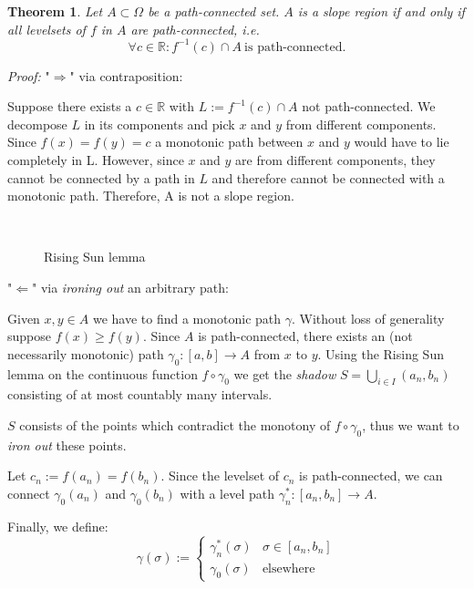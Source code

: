 \documentclass[11pt,twoside,twocolumn,a4paper]{article}
\theoremstyle{plain}
\newtheorem{thm}{Theorem}[section] %
\theoremstyle{definition}
\begin{document}
\begin{thm}
\label{slope_iff_conn_lvlsets}
Let $A \subset \Omega$ be a path-connected set.
$A$ is a slope region if and only if all levelsets of $f$ in $A$ are path-connected, i.e.
\begin{equation*}
\forall c \in \mathbb{R}: f^{-1}(c) \cap A ~ \text{is path-connected}.
\end{equation*}
\end{thm}

\emph{Proof:} "$\Rightarrow$" via contraposition:

Suppose there exists a $c \in \mathbb{R}$ with $L := f^{-1}(c) \cap A$ not path-connected.
We decompose $L$ in its components and pick $x$ and $y$ from different components.
Since $f(x) = f(y) = c$ a monotonic path between $x$ and $y$ would have to lie completely in L.
However, since $x$ and $y$ are from different components, they cannot be connected by a path in $L$ and therefore cannot be connected with a monotonic path.
Therefore, A is not a slope region.

$~$

\begin{figure}
\centering
\def\svgwidth{0.4\textwidth}

\caption{Rising Sun lemma}
\label{fig:lemma_1}
\end{figure}

"$\Leftarrow$" via \emph{ironing out} an arbitrary path:

Given $x, y \in A$ we have to find a monotonic path $\gamma$.
Without loss of generality suppose $f(x) \geq f(y)$.
Since $A$ is path-connected, there exists an (not necessarily monotonic) path $\gamma_0: [a,b] \to A$ from $x$ to $y$.
Using the Rising Sun lemma \cite{riesz1932theoreme} on the continuous function $f \circ \gamma_0$ we get the \emph{shadow} $S = \bigcup_{i \in I} (a_n, b_n)$ consisting of at most countably many intervals.

$S$ consists of the points which contradict the monotony of $f \circ \gamma_0$, thus we want to \emph{iron out} these points.

Let $c_n := f(a_n) = f(b_n)$. Since the levelset of $c_n$ is path-connected, we can connect $\gamma_0(a_n)$ and $\gamma_0(b_n)$ with a level path $\gamma_n^* : [a_n, b_n] \to A.$

Finally, we define:
\begin{equation*}
\gamma(\sigma) :=
\begin{cases}
\gamma_n^*(\sigma) & \sigma \in [a_n, b_n] \\
\gamma_0(\sigma) & \text{elsewhere}
\end{cases}
\end{equation*}
\end{document}
